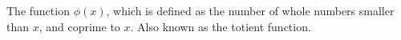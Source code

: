 The function $ \phi (x)$, which is defined as the number of
 whole numbers smaller than $x$, and coprime to $x$. Also
 known as the totient function.